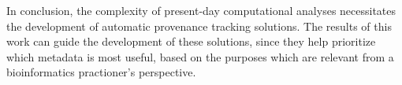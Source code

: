In conclusion, the complexity of present-day computational analyses necessitates the development of automatic provenance tracking solutions. The results of this work can guide the development of these solutions, since they help prioritize which metadata is most useful, based on the purposes which are relevant from a bioinformatics practioner's perspective.




















